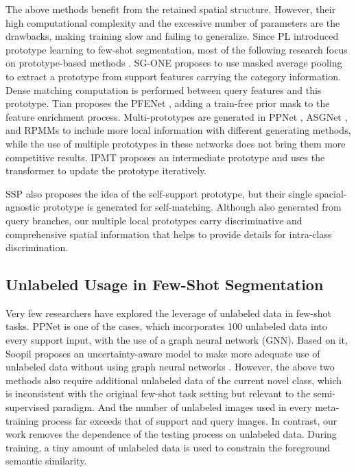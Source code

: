\documentclass[letterpaper]{article} %
\begin{document}
The above methods benefit from the retained spatial structure. However, their high computational complexity and the excessive number of parameters are the drawbacks, making training slow and failing to generalize. Since PL \cite{dong2018few} introduced prototype learning to few-shot segmentation, most of the following research focus on prototype-based methods \cite{zhang2019canet,wang2019panet}. SG-ONE \cite{zhang2020sg} proposes to use masked average pooling to extract a prototype from support features carrying the category information. Dense matching computation is performed between query features and this prototype. Tian proposes the PFENet \cite{tian2020prior}, adding a train-free prior mask to the feature enrichment process. Multi-prototypes are generated in PPNet \cite{liu2020part}, ASGNet \cite{li2021adaptive}
, and RPMMs \cite{yang2020prototype} to include more local information with different generating methods, while the use of multiple prototypes in these networks does not bring them more competitive results. IPMT \cite{liu2022intermediate} proposes an intermediate prototype and uses the transformer to update the prototype iteratively.

SSP \cite{fan2022self} also proposes the idea of the self-support prototype, but their single spacial-agnostic prototype is generated for self-matching. Although also generated from query branches, our multiple local prototypes carry discriminative and comprehensive spatial information that helps to provide details for intra-class discrimination.


\subsection{Unlabeled Usage in Few-Shot Segmentation}
Very few researchers have explored the leverage of unlabeled data in few-shot tasks. PPNet \cite{liu2020part} is one of the cases, which incorporates 100 unlabeled data into every support input, with the use of a graph neural network (GNN). Based on it, Soopil proposes an uncertainty-aware model to make more adequate use of unlabeled data without using graph neural networks \cite{kim2023uncertainty}. However, the above two methods also require additional unlabeled data of the current novel class, which is inconsistent with the original few-shot task setting but relevant to the semi-supervised paradigm. And the number of unlabeled images used in every meta-training process far exceeds that of support and query images. In contrast, our work removes the dependence of the testing process on unlabeled data. During training, a tiny amount of unlabeled data is used to constrain the foreground semantic similarity.
\end{document}
